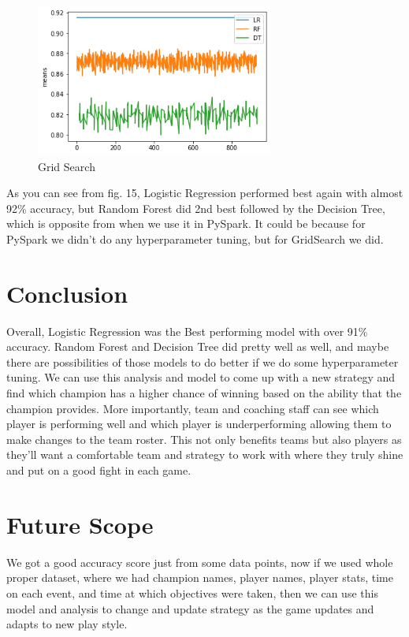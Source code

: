 \documentclass[conference]{IEEEtran}
\begin{document}
\begin{figure}[!ht]
  \begin{center}
 \includegraphics[height=5cm]{graphics/grid.png}
 \caption{Grid Search}
 \label{Grid Search}
 \end{center}
\end{figure}

As you can see from fig. 15, Logistic Regression performed best again with almost 92\% accuracy, but Random Forest did 2nd best followed by the Decision Tree, which is opposite from when we use it in PySpark. It could be because for PySpark we didn't do any hyperparameter tuning, but for GridSearch we did. 


\section{Conclusion}
Overall, Logistic Regression was the Best performing model with over 91\% accuracy. Random Forest and Decision Tree did pretty well as well, and maybe there are possibilities of those models to do better if we do some hyperparameter tuning. 
We can use this analysis and model to come up with a new strategy and find which champion has a higher chance of winning based on the ability that the champion provides. More importantly, team and coaching staff can see which player is performing well and which player is underperforming allowing them to make changes to the team roster. This not only benefits teams but also players as they'll want a comfortable team and strategy to work with where they truly shine and put on a good fight in each game. 


\section{Future Scope}
We got a good accuracy score just from some data points, now if we used whole proper dataset, where we had champion names, player names, player stats, time on each event, and time at which objectives were taken, then we can use this model and analysis to change and update strategy as the game updates and adapts to new play style.
\end{document}
